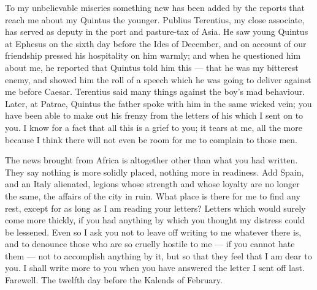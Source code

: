 

 To my unbelievable miseries something new has been added by the reports that reach me about my Quintus the younger. Publius Terentius, my close associate, has served as deputy in the port and pasture-tax of Asia. He saw young Quintus at Ephesus on the sixth day before the Ides of December, and on account of our friendship pressed his hospitality on him warmly; and when he questioned him about me, he reported that Quintus told him this --- that he was my bitterest enemy, and showed him the roll of a speech which he was going to deliver against me before Caesar. Terentius said many things against the boy's mad behaviour. Later, at Patrae, Quintus the father spoke with him in the same wicked vein; you have been able to make out his frenzy from the letters of his which I sent on to you. I know for a fact that all this is a grief to you; it tears at me, all the more because I think there will not even be room for me to complain to those men.

 The news brought from Africa is altogether other than what you had written. They say nothing is more solidly placed, nothing more in readiness. Add Spain, and an Italy alienated, legions whose strength and whose loyalty are no longer the same, the affairs of the city in ruin. What place is there for me to find any rest, except for as long as I am reading your letters? Letters which would surely come more thickly, if you had anything by which you thought my distress could be lessened. Even so I ask you not to leave off writing to me whatever there is, and to denounce those who are so cruelly hostile to me ---  if you cannot hate them --- not to accomplish anything by it, but so that they feel that I am dear to you. I shall write more to you when you have answered the letter I sent off last. Farewell. The twelfth day before the Kalends of February.
